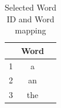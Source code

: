 \documentclass{IEEEtran}
\begin{document}
\begin{table}[ht]
  \caption{Selected Word ID and Word mapping}
  \centering
  \begin{tabular}{c c c }
  \hline\hline
                &         Word \\ [0.5ex]
  \hline
              1 &            a \\
              2 &           an \\ [1ex]
              3 &          the \\ [1ex]
  \hline
  \end{tabular}
  \label{table:nonlin}
\end{table}
\end{document}
